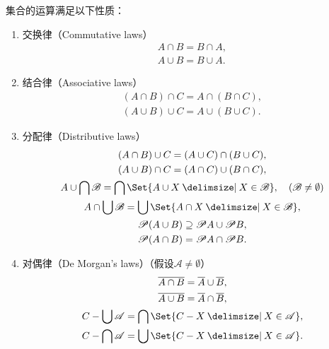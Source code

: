 \begin{property}
集合的运算满足以下性质：
\begin{enumerate}
\item 交换律（{\rm Commutative laws}）
\begin{gather}
	A \cap B = B \cap A, \label{equation:集合论.集合代数公式1-1} \\
	A \cup B = B \cup A. \label{equation:集合论.集合代数公式1-2}
\end{gather}

\item 结合律（{\rm Associative laws}）
\begin{gather}
	(A \cap B) \cap C = A \cap (B \cap C), \label{equation:集合论.集合代数公式2-1} \\
	(A \cup B) \cup C = A \cup (B \cup C). \label{equation:集合论.集合代数公式2-2}
\end{gather}

\item 分配律（{\rm Distributive laws}）
\begin{gather}
	(A \cap B) \cup C = (A \cup C) \cap (B \cup C), \label{equation:集合论.集合代数公式3-1} \\
	(A \cup B) \cap C = (A \cap C) \cup (B \cap C), \label{equation:集合论.集合代数公式3-2} \\
	A \cup \bigcap \mathscr{B} = \bigcap\Set{A \cup X \given X \in \mathscr{B}}, \quad(\mathscr{B}\neq\emptyset) \label{equation:集合论.集合代数公式3-3} \\
	A \cap \bigcup \mathscr{B} = \bigcup\Set{A \cap X \given X \in \mathscr{B}}, \label{equation:集合论.集合代数公式3-4} \\
	\Powerset (A \cup B) \supseteq \Powerset A \cup \Powerset B, \label{equation:集合论.集合代数公式3-5} \\ %
	\Powerset (A \cap B) = \Powerset A \cap \Powerset B. \label{equation:集合论.集合代数公式3-6} %
\end{gather}

\item 对偶律（{\rm De Morgan's laws}）（假设\(\mathscr{A}\neq\emptyset\)）
\begin{gather}
	\overline{A \cap B} = \overline A \cup \overline B, \label{equation:集合论.集合代数公式4-1} \\
	\overline{A \cup B} = \overline A \cap \overline B, \label{equation:集合论.集合代数公式4-2} \\
	C - \bigcup\mathscr{A} = \bigcap\Set{C-X \given X\in\mathscr{A}}, \label{equation:集合论.集合代数公式4-3} \\
	C - \bigcap\mathscr{A} = \bigcup\Set{C-X \given X\in\mathscr{A}}. \label{equation:集合论.集合代数公式4-4}
\end{gather}


\end{enumerate}
\end{property}
